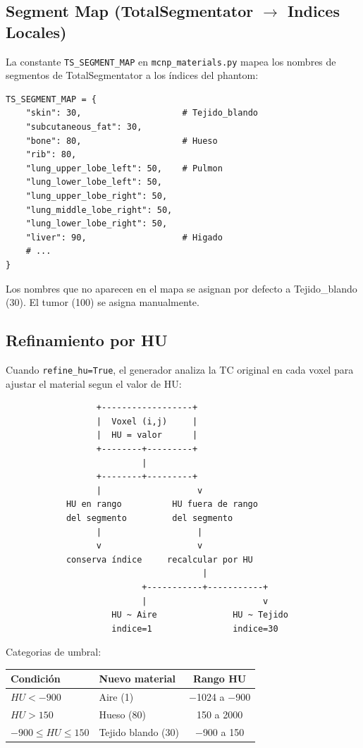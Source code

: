 \documentclass[12pt,a4paper]{article}
\begin{document}
\subsection{Segment Map (TotalSegmentator $\to$ Indices Locales)}

La constante \texttt{TS\_SEGMENT\_MAP} en \texttt{mcnp\_materials.py} mapea los nombres de segmentos de TotalSegmentator a los índices del phantom:

\begin{lstlisting}
TS_SEGMENT_MAP = {
    "skin": 30,                    # Tejido_blando
    "subcutaneous_fat": 30,
    "bone": 80,                    # Hueso
    "rib": 80,
    "lung_upper_lobe_left": 50,    # Pulmon
    "lung_lower_lobe_left": 50,
    "lung_upper_lobe_right": 50,
    "lung_middle_lobe_right": 50,
    "lung_lower_lobe_right": 50,
    "liver": 90,                   # Higado
    # ...
}
\end{lstlisting}

Los nombres que no aparecen en el mapa se asignan por defecto a Tejido\_blando (30). El tumor (100) se asigna manualmente.

\subsection{Refinamiento por HU}

Cuando \texttt{refine\_hu=True}, el generador analiza la TC original en cada voxel para ajustar el material segun el valor de HU:

\begin{lstlisting}
                  +------------------+
                  |  Voxel (i,j)     |
                  |  HU = valor      |
                  +--------+---------+
                           |
                  +--------+---------+
                  |                   v
            HU en rango          HU fuera de rango
            del segmento         del segmento
                  |                   |
                  v                   v
            conserva índice     recalcular por HU
                                       |
                           +-----------+-----------+
                           |                       v
                     HU ~ Aire               HU ~ Tejido
                     indice=1                indice=30
\end{lstlisting}

Categorias de umbral:

\begin{center}
\begin{tabular}{llc}
\toprule
\textbf{Condición} & \textbf{Nuevo material} & \textbf{Rango HU} \\
\midrule
$HU < -900$ & Aire (1) & $-$1024 a $-$900 \\
$HU > 150$ & Hueso (80) & 150 a 2000 \\
$-900 \leq HU \leq 150$ & Tejido blando (30) & $-$900 a 150 \\
\bottomrule
\end{tabular}
\end{center}
\end{document}
